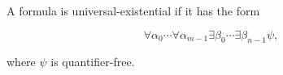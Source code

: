 A formula is universal-existential if it has the form

$$\forall \alpha_0 \cdots \forall \alpha_{m-1} \exists \beta_0 \cdots \exists \beta_{n-1} \psi,$$

where $\psi$ is quantifier-free.
